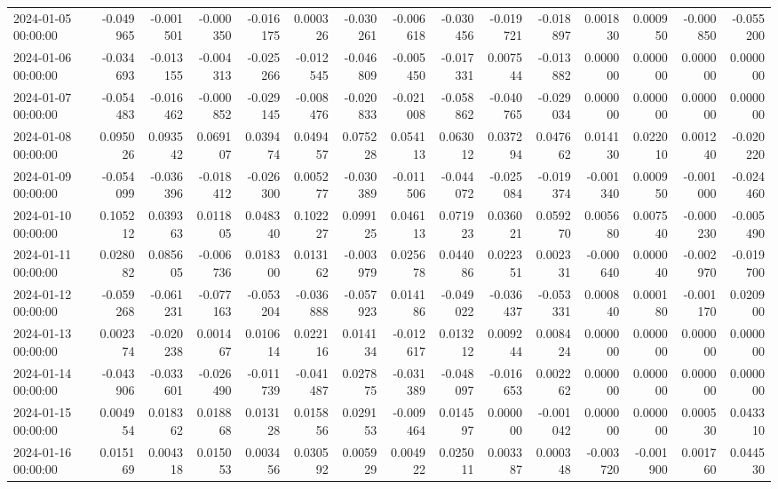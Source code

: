 \begin{tabular}{lrrrrrrrrrrrrrr}
2024-01-05 00:00:00 & -0.049965 & -0.001501 & -0.000350 & -0.016175 & 0.000326 & -0.030261 & -0.006618 & -0.030456 & -0.019721 & -0.018897 & 0.001830 & 0.000950 & -0.000850 & -0.055200 \\
2024-01-06 00:00:00 & -0.034693 & -0.013155 & -0.004313 & -0.025266 & -0.012545 & -0.046809 & -0.005450 & -0.017331 & 0.007544 & -0.013882 & 0.000000 & 0.000000 & 0.000000 & 0.000000 \\
2024-01-07 00:00:00 & -0.054483 & -0.016462 & -0.000852 & -0.029145 & -0.008476 & -0.020833 & -0.021008 & -0.058862 & -0.040765 & -0.029034 & 0.000000 & 0.000000 & 0.000000 & 0.000000 \\
2024-01-08 00:00:00 & 0.095026 & 0.093542 & 0.069107 & 0.039474 & 0.049457 & 0.075228 & 0.054113 & 0.063012 & 0.037294 & 0.047662 & 0.014130 & 0.022010 & 0.001240 & -0.020220 \\
2024-01-09 00:00:00 & -0.054099 & -0.036396 & -0.018412 & -0.026300 & 0.005277 & -0.030389 & -0.011506 & -0.044072 & -0.025084 & -0.019374 & -0.001340 & 0.000950 & -0.001000 & -0.024460 \\
2024-01-10 00:00:00 & 0.105212 & 0.039363 & 0.011805 & 0.048340 & 0.102227 & 0.099125 & 0.046113 & 0.071923 & 0.036021 & 0.059270 & 0.005680 & 0.007540 & -0.000230 & -0.005490 \\
2024-01-11 00:00:00 & 0.028082 & 0.085605 & -0.006736 & 0.018300 & 0.013162 & -0.003979 & 0.025678 & 0.044086 & 0.022351 & 0.002331 & -0.000640 & 0.000040 & -0.002970 & -0.019700 \\
2024-01-12 00:00:00 & -0.059268 & -0.061231 & -0.077163 & -0.053204 & -0.036888 & -0.057923 & 0.014186 & -0.049022 & -0.036437 & -0.053331 & 0.000840 & 0.000180 & -0.001170 & 0.020900 \\
2024-01-13 00:00:00 & 0.002374 & -0.020238 & 0.001467 & 0.010614 & 0.022116 & 0.014134 & -0.012617 & 0.013212 & 0.009244 & 0.008424 & 0.000000 & 0.000000 & 0.000000 & 0.000000 \\
2024-01-14 00:00:00 & -0.043906 & -0.033601 & -0.026490 & -0.011739 & -0.041487 & 0.027875 & -0.031389 & -0.048097 & -0.016653 & 0.002262 & 0.000000 & 0.000000 & 0.000000 & 0.000000 \\
2024-01-15 00:00:00 & 0.004954 & 0.018362 & 0.018868 & 0.013128 & 0.015856 & 0.029153 & -0.009464 & 0.014597 & 0.000000 & -0.001042 & 0.000000 & 0.000000 & 0.000530 & 0.043310 \\
2024-01-16 00:00:00 & 0.015169 & 0.004318 & 0.015053 & 0.003456 & 0.030592 & 0.005929 & 0.004922 & 0.025011 & 0.003387 & 0.000348 & -0.003720 & -0.001900 & 0.001760 & 0.044530 \\

\end{tabular}
